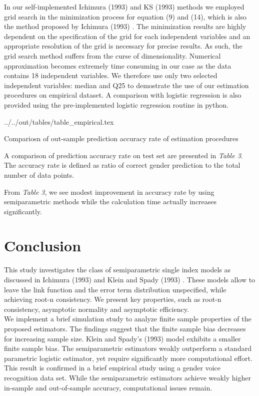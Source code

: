 In our self-implemented Ichimura (1993) \cite{[6]} and KS (1993) \cite{[12]} methods we employed grid search in the minimization process for equation (9) and (14), which is also the method proposed by Ichimura (1993) \cite{[6]}. The minimization results are highly dependent on the specification of the grid for each independent variables and an appropriate resolution of the grid is necessary for precise results. As such, the grid search method suffers from the curse of dimensionality. Numerical approximation becomes extremely time consuming in our case as the data contains 18 independent variables. We therefore use only two selected independent variables: median and Q25 to demostrate the use of our estimation procedures on empirical dataset. A comparison with logistic regression is also provided using the pre-implemented logistic regression routine in python.


\begin{table}[H]
\centering
 {../../out/tables/table_empirical.tex}
\caption {Compariosn of out-sample prediction accuracy rate of estimation procedures} 
\end{table}


A comparison of prediction accuracy rate on test set are presented in \textit{Table 3}. The accuracy rate is defined as ratio of correct gender prediction to the total number of data points.


From \textit{Table 3}, we see modest improvement in accuracy rate by using semiparametric methods while the calculation time actually increases significantly.  


\section{Conclusion} %
\label{sec:Conclusion}

This study investigates the class of semiparametric single index models as discussed in Ichimura (1993) \cite{[6]} and Klein and Spady (1993) \cite{[12]}. These models allow to leave the link function and the error term distribution unspecified, while achieving root-n consistency. We present key properties, such as root-n consistency, asymptotic normality and asymptotic efficiency.\\
We implement a brief simulation study to analyze finite sample properties of the proposed estimators. The findings suggest that the finite sample bias decreases for increasing sample size. Klein and Spady's (1993) \cite{[12]} model exhibits a smaller finite sample bias. The semiparametric estimators weakly outperform a standard parametric logistic estimator, yet require significantly more computational effort.\\
This result is confirmed in a brief empirical study using a gender voice recognition data set. While the semiparametric estimators achieve weakly higher in-sample and out-of-sample accuracy, computational issues remain.\\



